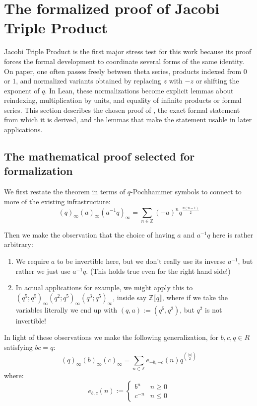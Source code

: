 \documentclass[12pt]{amsart}
\theoremstyle{definition}
\theoremstyle{remark}
\numberwithin{equation}{subsection}
\newcommand{\ps}[1]{\llbracket #1 \rrbracket} %
\newcommand{\Z}{\mathbb Z}
\begin{document}
\section{The formalized proof of Jacobi Triple Product}\label{sec:JTP}

Jacobi Triple Product is the first major stress test for this work because its proof forces the formal development to coordinate several forms of the same identity.  On paper, one often passes freely between theta series, products indexed from $0$ or $1$, and normalized variants obtained by replacing $z$ with $-z$ or shifting the exponent of $q$.  In Lean, these normalizations become explicit lemmas about reindexing, multiplication by units, and equality of infinite products or formal series.  This section describes the chosen proof of , the exact formal statement from which it is derived, and the lemmas that make the statement usable in later applications.

\subsection{The mathematical proof selected for formalization}

We first restate the theorem in terms of $q$-Pochhammer symbols to connect to more of the existing infrastructure:
\begin{equation}\label{eqn:jtp-a-q}
    (q)_\infty (a)_\infty (a^{-1}q)_\infty = \sum_{n \in \Z} (-a)^n q^{\frac{n(n-1)}2}
\end{equation}

Then we make the observation that the choice of having $a$ and $a^{-1}q$ here is rather arbitrary:
\begin{enumerate}
    \item We require $a$ to be invertible here, but we don't really use its inverse $a^{-1}$, but rather we just use $a^{-1}q$. (This holds true even for the right hand side!)
    \item In actual applications for example, we might apply this to $(q^5; q^5)_\infty (q^2; q^5)_\infty (q^3; q^5)_\infty$, inside say $\Z\ps{q}$, where if we take the variables literally we end up with $(q, a) := (q^5, q^2)$, but $q^2$ is not invertible!
\end{enumerate} 

In light of these observations we make the following generalization, for $b, c, q \in R$ satisfying $bc=q$:
\begin{equation}
    \label{eqn:jtp-general}
    (q)_\infty (b)_\infty (c)_\infty = \sum_{n \in \Z} e_{-b,-c}(n) q^{\binom{|n|}{2}}
\end{equation}
where:
\begin{equation}
    e_{b,c}(n) := \begin{cases} b^n & n \ge 0 \\ c^{-n} & n \le 0 \end{cases}
\end{equation}
\end{document}

